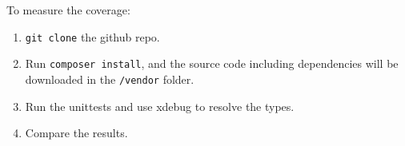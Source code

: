 \documentclass[../main.tex]{subfiles}
\begin{document}
To measure the coverage:
\begin{enumerate} \itemsep1pt \parskip0pt 
    \item \texttt{git clone} the github repo.
    \item Run \texttt{composer install}, and the source code including dependencies will be downloaded in the \texttt{/vendor} folder.
    \item Run the unittests and use xdebug to resolve the types.
    \item Compare the results.
\end{enumerate}
\end{document}
